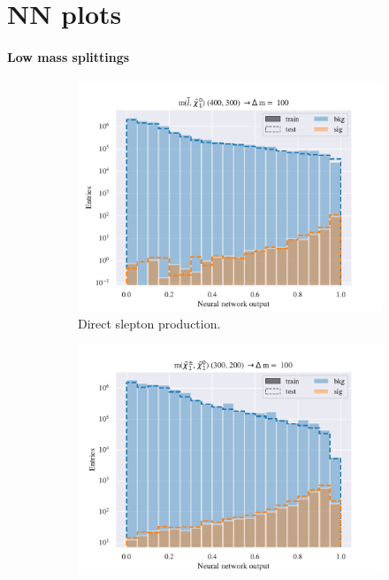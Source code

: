 \chapter{NN plots}
\label{sec:appNNplots}

\subsubsection{Low mass splittings}
\begin{figure}[H]
    \centering
    \begin{subfigure}[t!]{0.49\textwidth}
        \includegraphics[width = \textwidth]{Figures/SlepSlep/ML/NN/Low_level/Low/scaled_train_test_395984.pdf}
        \caption{Direct slepton production.}
        \label{fig:SlepslepNNLow}
    \end{subfigure}
    \begin{subfigure}[t!]{0.49\textwidth}
        \includegraphics[width = \textwidth]{Figures/SlepSnu/NN/Low_level/Low/scaled_train_test_397115.pdf}

\end{subfigure}
\end{figure}
